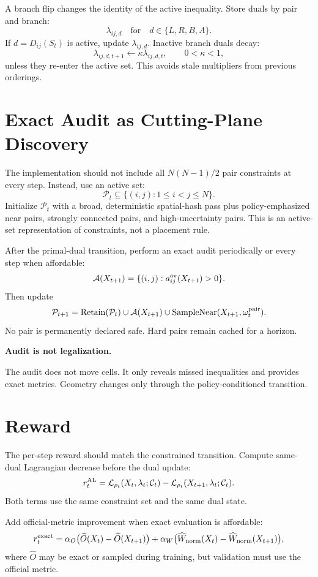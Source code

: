 \documentclass[11pt]{article}
\newcommand{\Pset}{\mathcal{P}}
\newcommand{\Constraint}{\mathcal{C}}
\newcommand{\Lagr}{\mathcal{L}}
\newcommand{\Audit}{\mathcal{A}}
\newcommand{\callout}[3]{%
\medskip\noindent\textbf{\textcolor{#1}{#2.}}\par\noindent #3\par\medskip
}
\begin{document}
A branch flip changes the identity of the active inequality. Store duals by pair and branch:
\[
    \lambda_{ij,d}\quad\text{for}\quad d\in\{L,R,B,A\}.
\]
If $d=D_{ij}(S_t)$ is active, update $\lambda_{ij,d}$. Inactive branch duals decay:
\[
    \lambda_{ij,d,t+1}\leftarrow \kappa\lambda_{ij,d,t},
    \qquad 0<\kappa<1,
\]
unless they re-enter the active set. This avoids stale multipliers from previous orderings.

\section{Exact Audit as Cutting-Plane Discovery}

The implementation should not include all $N(N-1)/2$ pair constraints at every step. Instead, use an active set:
\[
    \Pset_t\subseteq\{(i,j):1\le i<j\le N\}.
\]
Initialize $\Pset_t$ with a broad, deterministic spatial-hash pass plus policy-emphasized near pairs, strongly connected pairs, and high-uncertainty pairs. This is an active-set representation of constraints, not a placement rule.

After the primal-dual transition, perform an exact audit periodically or every step when affordable:
\[
    \Audit(X_{t+1})=\{(i,j):a^{\rm ov}_{ij}(X_{t+1})>0\}.
\]
Then update
\[
    \Pset_{t+1}=\operatorname{Retain}(\Pset_t)\cup\Audit(X_{t+1})\cup\operatorname{SampleNear}(X_{t+1},\omega_t^{\rm pair}).
\]
No pair is permanently declared safe. Hard pairs remain cached for a horizon.

\callout{orange!80!black}{Audit is not legalization}{The audit does not move cells. It only reveals missed inequalities and provides exact metrics. Geometry changes only through the policy-conditioned transition.}

\section{Reward}

The per-step reward should match the constrained transition. Compute same-dual Lagrangian decrease before the dual update:
\[
    r_t^{\rm AL}
    =\Lagr_{\rho_t}(X_t,\lambda_t;\Constraint_t)
    -\Lagr_{\rho_t}(X_{t+1},\lambda_t;\Constraint_t).
\]
Both terms use the same constraint set and the same dual state.

Add official-metric improvement when exact evaluation is affordable:
\[
    r_t^{\rm exact}
    =\alpha_O\bigl(\widehat O(X_t)-\widehat O(X_{t+1})\bigr)
    +\alpha_W\bigl(\widehat W_{\rm norm}(X_t)-\widehat W_{\rm norm}(X_{t+1})\bigr),
\]
where $\widehat O$ may be exact or sampled during training, but validation must use the official metric.
\end{document}
